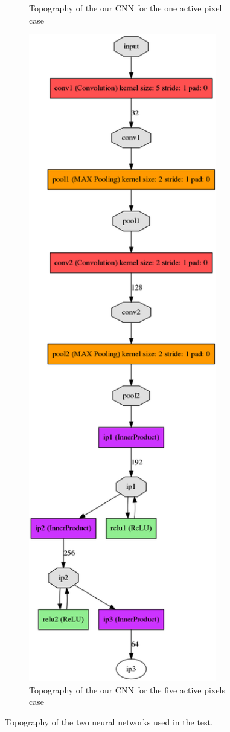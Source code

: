 \documentclass[twoside]{article}
\begin{document}
\begin{multicols}{2}
\begin{figure}
\begin{subfigure}[b]{0.42\textwidth}
	\caption{Topography of the our CNN for the one active pixel case}
	\label{4x4net}
\end{subfigure}
\begin{subfigure}[b]{0.42\textwidth}
	\includegraphics[width=0.9\textwidth]{images/8x8/minnd_dia}
	\caption{Topography of the our CNN for the five active pixels case}
	\label{8x8net}
\end{subfigure}
\caption{Topography of the two neural networks used in the test.}
\end{figure}


\end{multicols}
\end{document}

